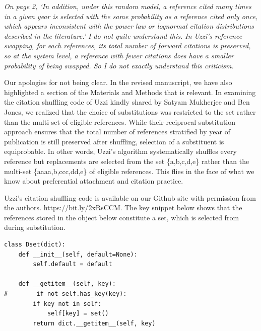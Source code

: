 \documentclass[11pt, oneside]{article}   	%
\begin{document}
 
\emph{On page 2, `In addition, under this random model, a reference cited many times in a given year is selected with the same probability as a reference cited only once, which appears inconsistent with the power law or lognormal citation distributions described in the literature.'  I do not quite understand this.  In Uzzi's reference swapping, for each references, its total number of forward citations is preserved, so at the system level, a reference with fewer citations does have a smaller probability of being swapped.  So I do not exactly understand this criticism.}

Our apologies for not being clear. In the  revised manuscript, we have also highlighted a section of the Materials and Methods that is relevant. In examining the citation shuffling code of Uzzi kindly shared by Satyam Mukherjee and Ben Jones, we realized that the choice of substitutions was restricted to the set rather than the multi-set of eligible references. While their reciprocal substitution approach  ensures that the total number of references stratified by year of publication is still preserved after shuffling, selection of a substituent is equiprobable. In other words, Uzzi's algorithm systematically shuffles every reference but replacements are selected from the set \{a,b,c,d,e\} rather than the multi-set \{aaaa,b,ccc,dd,e\} of eligible references. This flies in the face of what we know about preferential attachment and citation practice. 

Uzzi's citation shuffling code is available on our Github site with permission from the authors. https://bit.ly/2xRsCCM. The key snippet below shows that the references stored in the object below constitute a set, which is selected from during substitution. 

\begin{verbatim}
class Dset(dict):
    def __init__(self, default=None):
        self.default = default

    def __getitem__(self, key):
#        if not self.has_key(key):
        if key not in self:
            self[key] = set()
        return dict.__getitem__(self, key)
\end{verbatim}
\end{document}
